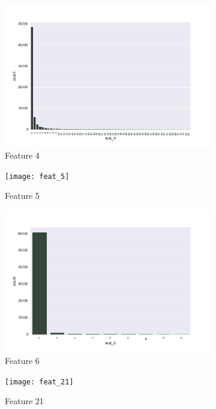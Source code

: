 \documentclass[a4paper,english,12pt]{article}
\begin{document}
\begin{figure}[H]
	\centering
	\begin{subfigure}{0.22\textwidth}
		\includegraphics[width=\textwidth]{feat_4}
		\caption{Feature 4}
	\end{subfigure}
	\begin{subfigure}{0.22\textwidth}
		\texttt{[image: feat\_5]}
		\caption{Feature 5}
	\end{subfigure}
	\begin{subfigure}{0.22\textwidth}
		\includegraphics[width=\textwidth]{feat_6}
		\caption{Feature 6}
	\end{subfigure}
	\begin{subfigure}{0.22\textwidth}
		\texttt{[image: feat\_21]}
		\caption{Feature 21}
	\end{subfigure}
		\\
	\begin{subfigure}{0.22\textwidth}

\end{subfigure}
\end{figure}
\end{document}
